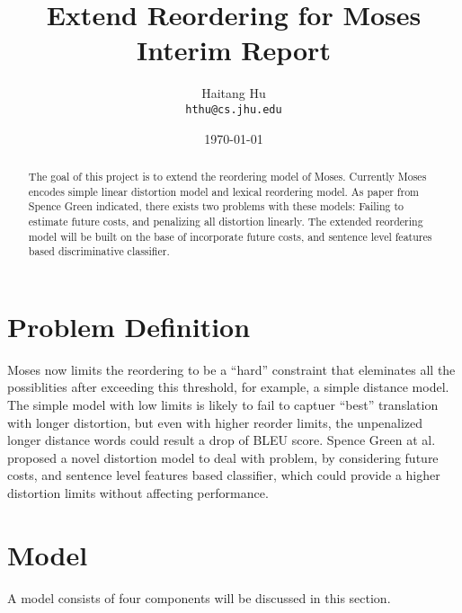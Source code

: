 \documentclass[11pt,letterpaper]{article}
\title{Extend Reordering for Moses\\Interim Report}
\author{Haitang Hu\\
  {\tt hthu@cs.jhu.edu}}
\date{\today}
\begin{document}
\maketitle
\begin{abstract}
The goal of this project is to extend the reordering model of Moses\cite{moses:2007}. Currently Moses encodes simple linear distortion model\cite{spt:2003} and lexical reordering model. As paper from Spence Green\cite{dc:2010} indicated, there exists two problems with these models: Failing to estimate future costs, and penalizing all distortion linearly. The extended reordering model will be built on the base of incorporate future costs, and sentence level features based discriminative classifier.
\end{abstract}

\section{Problem Definition} %
\label{sec:problem_definition}
Moses now limits the reordering to be a ``hard'' constraint that eleminates all the possiblities after exceeding this threshold, for example, a simple distance model. The simple model with low limits is likely to fail to captuer ``best'' translation with longer distortion, but even with higher reorder limits, the unpenalized longer distance words could result a drop of BLEU score. Spence Green at al.\cite{dc:2010} proposed a novel distortion model to deal with problem, by considering future costs, and sentence level features based classifier, which could provide a higher distortion limits without affecting performance.

\section{Model} %
\label{sec:model}
A model consists of four components will be discussed in this section.
\end{document}
